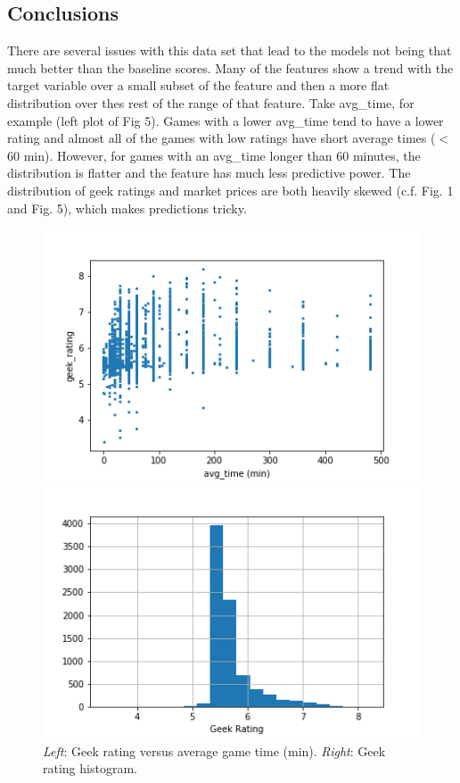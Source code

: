 \documentclass[12pt]{article}
\begin{document}
\subsection{Conclusions}
There are several issues with this data set that lead to the models not being that much better than the baseline scores. Many of the features show a trend with the target variable over a small subset of the feature and then a more flat distribution over thes rest of the range of that feature. Take avg\_time, for example (left plot of Fig 5). Games with a lower avg\_time tend to have a lower rating and almost all of the games with low ratings have short average times ($<$60 min). However, for games with an avg\_time longer than 60 minutes, the distribution is flatter and the feature has much less predictive power. The distribution of geek ratings and market prices are both heavily skewed (c.f. Fig. 1 and Fig. 5), which makes predictions tricky. 

\begin{figure}[ht]
\centering
\begin{minipage}{.48\textwidth}
\centering
\includegraphics[width=\textwidth]{market_rating_avgtime.png}
\end{minipage} \hfill
\begin{minipage}{.48\textwidth}
\centering
\includegraphics[width=\textwidth]{market_rating_hist.png}
\end{minipage}
\caption{\small \textit{Left}: Geek rating versus average game time (min). \textit{Right}: Geek rating histogram.}
\end{figure}
\end{document}
